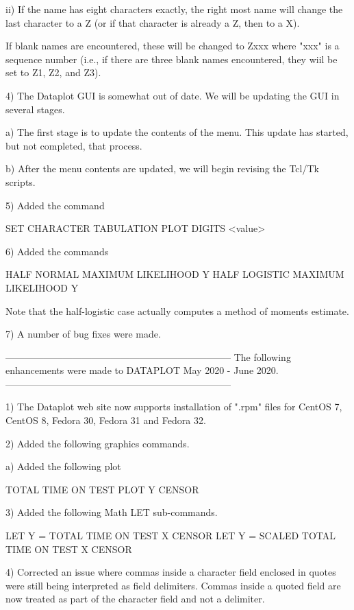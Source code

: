          ii) If the name has eight characters exactly, the right most
             name will change the last character to a Z (or if that
             character is already a Z, then to a X).

       If blank names are encountered, these will be changed to
       Zxxx where "xxx" is a sequence number (i.e., if there are three
       blank names encountered, they wiil be set to Z1, Z2, and Z3).

  4) The Dataplot GUI is somewhat out of date.  We will be updating the
     GUI in several stages.

     a) The first stage is to update the contents of the menu.  This
        update has started, but not completed, that process.

     b) After the menu contents are updated, we will begin revising
        the Tcl/Tk scripts.

  5) Added the command

         SET CHARACTER TABULATION PLOT DIGITS <value>

  6) Added the commands

         HALF NORMAL MAXIMUM LIKELIHOOD Y
         HALF LOGISTIC MAXIMUM LIKELIHOOD Y

     Note that the half-logistic case actually computes a method
     of moments estimate.

  7) A number of bug fixes were made.

-----------------------------------------------------------------------
The following enhancements were made to DATAPLOT
May 2020 - June 2020.
-----------------------------------------------------------------------

 1) The Dataplot web site now supports installation of ".rpm" files
    for CentOS 7, CentOS 8, Fedora 30, Fedora 31 and Fedora 32.

 2) Added the following graphics commands.

    a) Added the following plot

          TOTAL TIME ON TEST PLOT Y CENSOR

 3) Added the following Math LET sub-commands.

      LET Y = TOTAL TIME ON TEST        X CENSOR
      LET Y = SCALED TOTAL TIME ON TEST X CENSOR

 4) Corrected an issue where commas inside a character field enclosed
    in quotes were still being interpreted as field delimiters.  Commas
    inside a quoted field are now treated as part of the character
    field and not a delimiter.

